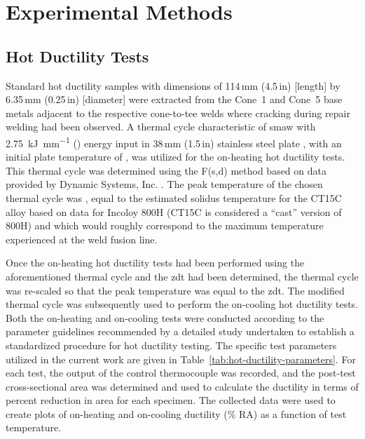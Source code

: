 \chapter{Experimental Methods} \label{ch:experimental-methods}

\section{Hot Ductility Tests}
Standard hot ductility samples with dimensions of 114\,mm (4.5\,in) [length] by 6.35\,mm (0.25\,in) [diameter] were extracted from the Cone~1 and Cone~5 base metals adjacent to the respective cone-to-tee welds where cracking during repair welding had been observed.  A thermal cycle characteristic of \gls{smaw} with \SI[round-mode=places,round-precision=2]{2.75}{\kilo\joule\per\milli\meter} () energy input in 38\,mm (1.5\,in) stainless steel plate \cite{nippes_heat-affected_1955}, with an initial plate temperature of , was utilized for the on-heating hot ductility tests.  This thermal cycle was determined using the F(s,d) method \cite{nippes_cooling_1949} based on data provided by Dynamic Systems, Inc. \cite{duffers_haz_1989}. The peak temperature of the chosen thermal cycle was , equal to the estimated solidus temperature for the CT15C alloy based on data for Incoloy 800H (CT15C is considered a ``cast'' version of 800H) and which would roughly correspond to the maximum temperature experienced at the weld fusion line.

Once the on-heating hot ductility tests had been performed using the aforementioned thermal cycle and the \gls{zdt} had been determined, the thermal cycle was re-scaled so that the peak temperature was equal to the \gls{zdt}. The modified thermal cycle was subsequently used to perform the on-cooling hot ductility tests.  Both the on-heating and on-cooling tests were conducted according to the parameter guidelines recommended by a detailed study \cite{lundin_standardization_1990_experiment} undertaken to establish a standardized procedure for hot ductility testing.  The specific test parameters utilized in the current work are given in Table~\ref{tab:hot-ductility-parameters}.  For each test, the output of the control thermocouple was recorded, and the post-test cross-sectional area was determined and used to calculate the ductility in terms of percent reduction in area for each specimen.  The collected data were used to create plots of on-heating and on-cooling ductility (\% RA) as a function of test temperature.

